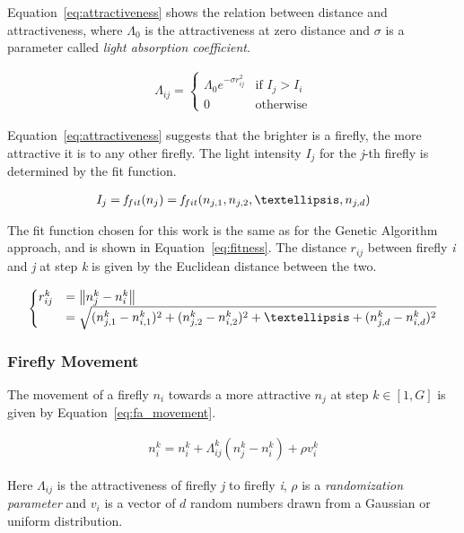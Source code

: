 Equation~\ref{eq:attractiveness} shows the relation between distance and attractiveness,
where $\Lambda_0$ is the attractiveness at zero distance and $\sigma$ is
a parameter called \textit{light absorption coefficient}.

\begin{align}
\label{eq:attractiveness}
\Lambda_{ij}=
\begin{cases}
\Lambda_0 e^{-\sigma r_{ij}^2} & \text{if } I_j > I_i \\
0 & \text{otherwise}
\end{cases}
\end{align}

Equation~\ref{eq:attractiveness} suggests that the brighter is a firefly,
the more attractive it is to any other firefly. The light intensity $I_j$
for the \textit{j}-th firefly is determined by the fit function.

\begin{align}
I_j = \mathit{f}_{fit}(n_j) = \mathit{f}_{fit}(n_{j,1},n_{j,2},\textellipsis,n_{j,d})
\end{align}


The fit function chosen for this work is the same as for the Genetic Algorithm
approach, and is shown in Equation~\ref{eq:fitness}. 
The distance $r_{ij}$ between firefly \textit{i} and \textit{j}
at step \textit{k} is given by the Euclidean distance between the two.

\begin{equation}
\begin{cases}
r_{ij}^k &= \norm{n_j^k-n_i^k} \\ 
&= \sqrt{(n_{j,1}^k-n_{i,1}^k)^2+(n_{j,2}^k-n_{i,2}^k)^2+\textellipsis+(n_{j,d}^k-n_{i,d}^k)^2}
\end{cases}
\end{equation}

\subsubsection{Firefly Movement}

The movement of a firefly $n_i$ towards a more attractive $n_j$ 
at step $k \in \left[1,G\right]$ is given by Equation~\ref{eq:fa_movement}.

\begin{align}
\label{eq:fa_movement}
n_i^k = n_i^k + \Lambda_{ij}^k\left(n_j^k-n_i^k\right)+\rho \mathit{v}_i^k
\end{align}

Here $\Lambda_{ij}$ is the attractiveness of firefly \textit{j} to firefly \textit{i},
$\rho$ is a \textit{randomization parameter} and $\mathit{v}_i$ is
a vector of $d$ random numbers drawn from a Gaussian or uniform distribution.

